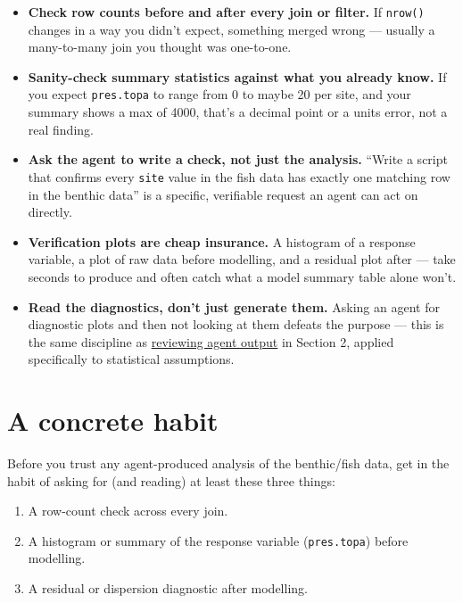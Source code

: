 \documentclass[
  letterpaper,
  DIV=11,
  numbers=noendperiod]{scrreprt}
\providecommand{\tightlist}{%
  \setlength{\itemsep}{0pt}\setlength{\parskip}{0pt}}
\begin{document}
\begin{itemize}
\tightlist
\item
  \textbf{Check row counts before and after every join or filter.} If
  \texttt{nrow()} changes in a way you didn't expect, something merged
  wrong --- usually a many-to-many join you thought was one-to-one.
\item
  \textbf{Sanity-check summary statistics against what you already
  know.} If you expect \texttt{pres.topa} to range from 0 to maybe 20
  per site, and your summary shows a max of 4000, that's a decimal point
  or a units error, not a real finding.
\item
  \textbf{Ask the agent to write a check, not just the analysis.}
  ``Write a script that confirms every \texttt{site} value in the fish
  data has exactly one matching row in the benthic data'' is a specific,
  verifiable request an agent can act on directly.
\item
  \textbf{Verification plots are cheap insurance.} A histogram of a
  response variable, a plot of raw data before modelling, and a residual
  plot after --- take seconds to produce and often catch what a model
  summary table alone won't.
\item
  \textbf{Read the diagnostics, don't just generate them.} Asking an
  agent for diagnostic plots and then not looking at them defeats the
  purpose --- this is the same discipline as
  \hyperref[reviewing-agent-output]{reviewing agent output} in Section
  2, applied specifically to statistical assumptions.
\end{itemize}

\section{A concrete habit}\label{a-concrete-habit}

Before you trust any agent-produced analysis of the benthic/fish data,
get in the habit of asking for (and reading) at least these three
things:

\begin{enumerate}
\def\labelenumi{\arabic{enumi}.}
\tightlist
\item
  A row-count check across every join.
\item
  A histogram or summary of the response variable (\texttt{pres.topa})
  before modelling.
\item
  A residual or dispersion diagnostic after modelling.
\end{enumerate}
\end{document}
